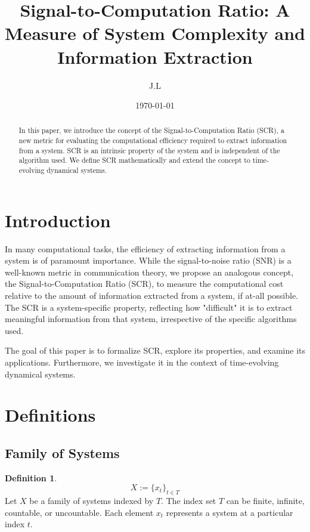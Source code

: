 \documentclass[11pt,a4paper]{article}
\title{Signal-to-Computation Ratio: A Measure of System Complexity and Information Extraction}
\author{J.L}
\date{\today}
\theoremstyle{definition}
\newtheorem{defn}{Definition}[section]
\theoremstyle{remark}
\numberwithin{equation}{section}
\begin{document}
\maketitle

\begin{abstract}
In this paper, we introduce the concept of the Signal-to-Computation Ratio (SCR), a new metric for evaluating the computational efficiency required to extract information from a system. SCR is an intrinsic property of the system and is independent of the algorithm used. We define SCR mathematically and extend the concept to time-evolving dynamical systems.
\end{abstract}

\section{Introduction}
In many computational tasks, the efficiency of extracting information from a system is of paramount importance. 
While the signal-to-noise ratio (SNR) is a well-known metric in communication theory, we propose an analogous concept, the Signal-to-Computation Ratio (SCR), to measure the computational cost relative to the amount of information extracted from a system, if at-all possible. 
The SCR is a system-specific property, reflecting how "difficult" it is to extract meaningful information from that system, irrespective of the specific algorithms used.

The goal of this paper is to formalize SCR, explore its properties, and examine its applications.
Furthermore, we investigate it  in the context of time-evolving dynamical systems. 


\newpage
\section{Definitions}


\subsection{Family of Systems}
\begin{defn}
\begin{equation}
X := \{x_t\}_{t \in T}
\end{equation}
Let \( X \) be a family of systems indexed by \( T \).
The index set \( T \) can be finite, infinite, countable, or uncountable.
Each element \( x_t \) represents a system at a particular index \( t \).
\end{defn}
\end{document}
